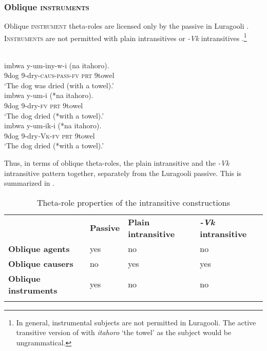 \documentclass[output=paper]{langsci/langscibook}
\begin{document}
\subsubsection{Oblique \textsc{instruments}}

Oblique \textsc{instrument} theta-roles are licensed only by the passive in Luragooli . \textsc{Instruments} are not permitted with plain intransitives  or \textit{-Vk} intransitives .\footnote{ In general, instrumental subjects are not permitted in Luragooli. The active transitive version of  with \textit{itahoro} ‘the towel’ as the subject would be ungrammatical.}

\ea\label{exx:}
\ea
{}\\
\gll imbwa y-um-iny-w-i            (na    itahoro).\\
     9dog 9-dry-\textsc{caus}-\textsc{pass}-\textsc{fv}   \textsc{prt}  9towel\\
\glt ‘The dog was dried (with a towel).’
\ex
{}\\
\gll imbwa y-um-i          (*na   itahoro).\\
     9dog   9-dry-\textsc{fv}         \textsc{prt} 9towel\\
\glt ‘The dog dried (*with a towel).’
\ex
{}\\
\gll imbwa  y-um-ik-i      (*na  itahoro).\\
     9dog    9-dry\textit{-}\textsc{Vk}-\textsc{fv} \textsc{prt} 9towel\\
\glt ‘The dog dried (*with a towel).’
\z
\z

Thus, in terms of oblique theta-roles, the plain intransitive and the \textit{-Vk} intransitive pattern together, separately from the Luragooli passive. This is summarized in .

\begin{table}
\caption{Theta-role properties of the intransitive constructions}
\label{tab:2}

\begin{tabularx}{\textwidth}{XXXX} & \textbf{Passive} & \textbf{Plain intransitive} & \textbf{\textit{-Vk }}\textbf{intransitive}\\
\lsptoprule
\textbf{Oblique agents} & yes & no & no\\
\textbf{Oblique causers} & no & yes & yes\\
\textbf{Oblique instruments} & yes & no & no\\
\lspbottomrule
\end{tabularx}
\end{table}
\end{document}
